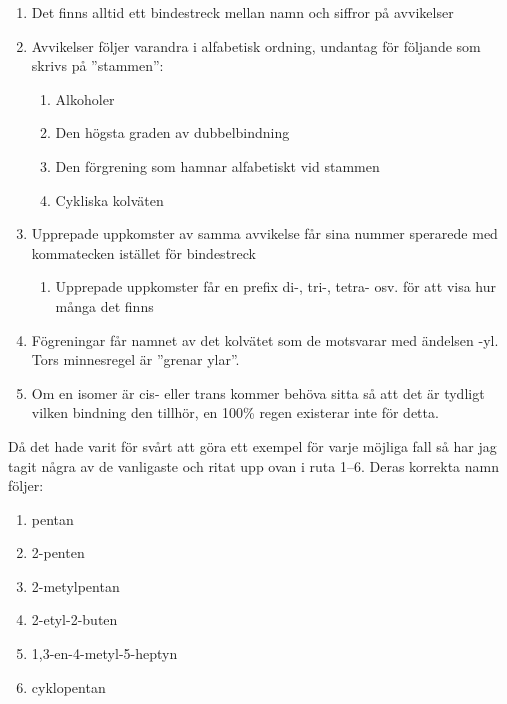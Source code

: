 \begin{enumerate}
    \item Det finns alltid ett bindestreck mellan namn och siffror på avvikelser
    \item Avvikelser följer varandra i alfabetisk ordning, undantag för följande som skrivs på ''stammen'':
    \begin{enumerate}
        \item Alkoholer
        \item Den högsta graden av dubbelbindning
        \item Den förgrening som hamnar alfabetiskt vid stammen
        \item Cykliska kolväten
    \end{enumerate}
    \item Upprepade uppkomster av samma avvikelse får sina nummer sperarede med kommatecken istället för bindestreck
    \begin{enumerate}
        \item Upprepade uppkomster får en prefix di-, tri-, tetra- osv. för att visa hur många det finns
    \end{enumerate}
    \item Fögreningar får namnet av det kolvätet som de motsvarar med ändelsen -yl. Tors minnesregel är ''grenar ylar''.
    \item Om en isomer är cis- eller trans kommer behöva sitta så att det är  tydligt vilken bindning den tillhör, en 100\% regen existerar inte för detta.
\end{enumerate}
Då det hade varit för svårt att göra ett exempel för varje möjliga fall så har jag tagit några av de vanligaste och ritat upp ovan i ruta 1--6. Deras korrekta namn följer:
\begin{enumerate}
    \item pentan
    \item 2-penten
    \item 2-metylpentan
    \item 2-etyl-2-buten
    \item 1,3-en-4-metyl-5-heptyn
    \item cyklopentan
\end{enumerate}


